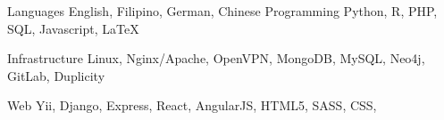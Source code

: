 

\begin{cvskills}

      \cvskill
        {Languages} %
        {English, Filipino, German, Chinese} %
  \cvskill
    {Programming} %
    {Python, R, PHP, SQL, Javascript, LaTeX} %

  \cvskill
  {Infrastructure}
  {Linux, Nginx/Apache, OpenVPN, MongoDB, MySQL, Neo4j, GitLab, Duplicity}

  \cvskill
    {Web} %
    {Yii, Django, Express, React, AngularJS, HTML5, SASS, CSS, } %

\end{cvskills}
